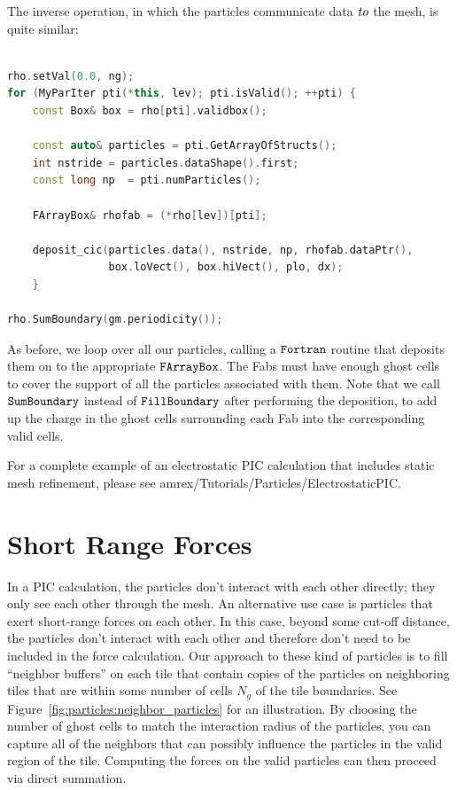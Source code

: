 The inverse operation, in which the particles communicate data $\emph{to}$ the mesh, is quite similar:

\begin{lstlisting}[language=cpp]

rho.setVal(0.0, ng);
for (MyParIter pti(*this, lev); pti.isValid(); ++pti) {
    const Box& box = rho[pti].validbox();

    const auto& particles = pti.GetArrayOfStructs();
    int nstride = particles.dataShape().first;
    const long np  = pti.numParticles();

    FArrayBox& rhofab = (*rho[lev])[pti];

    deposit_cic(particles.data(), nstride, np, rhofab.dataPtr(), 
                box.loVect(), box.hiVect(), plo, dx);
    }

rho.SumBoundary(gm.periodicity());

\end{lstlisting}

As before, we loop over all our particles, calling a $\tt{Fortran}$ routine that deposits them on to the appropriate $\tt{FArrayBox}$. The Fabs must have enough ghost cells to
cover the support of all the particles associated with them. Note that we call $\tt{SumBoundary}$ instead of $\tt{FillBoundary}$ after performing the deposition, to add up the charge 
in the ghost cells surrounding each Fab into the corresponding valid cells.

For a complete example of an electrostatic PIC calculation that includes static mesh refinement, please see amrex/Tutorials/Particles/ElectrostaticPIC.

\section{Short Range Forces}
\label{sec:Particles:ShortRange}

In a PIC calculation, the particles don't interact with each other directly; they only see each other through the mesh. An alternative use case is particles that exert short-range forces on each other. In this case, beyond some cut-off distance, the particles don't interact with each other and therefore don't need to be included in the force calculation. Our approach to these kind of particles is to fill ``neighbor buffers'' on each tile that contain copies of the particles on neighboring tiles that are within some number of cells $N_g$ of the tile boundaries. See Figure~\ref{fig:particles:neighbor_particles} for an illustration. By choosing the number of ghost cells to match the interaction radius of the particles, you can capture all of the neighbors that can possibly influence the particles in the valid region of the tile. Computing the forces on the valid particles can then proceed via direct summation.

